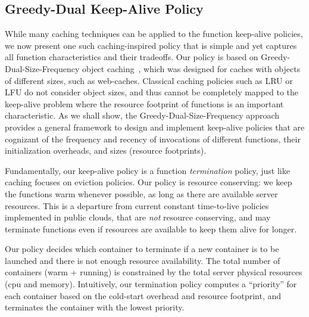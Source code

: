 


\vspace*{\subsecspace}
\subsection{Greedy-Dual Keep-Alive Policy}
\vspace*{\subsecspace}

While many caching techniques can be applied to the function keep-alive policies, we now present one such caching-inspired policy that is simple and yet captures all function characteristics and their tradeoffs.
Our policy is based on Greedy-Dual-Size-Frequency object caching~\cite{gdsf}, which was designed for caches with objects of  different sizes, such as web-caches. 
Classical caching policies such as LRU or LFU do not consider object sizes, and thus cannot be completely mapped to the keep-alive problem where the resource footprint of functions is an important characteristic. 
As we shall show, the Greedy-Dual-Size-Frequency approach provides a general framework to design and implement keep-alive policies that are cognizant of the  frequency and recency of invocations of different functions, their initialization overheads, and sizes (resource footprints). 



Fundamentally, our keep-alive policy is a function \emph{termination} policy, just like caching focuses on eviction policies. 
%
Our policy is resource conserving: we keep the functions warm whenever possible, as long as there are available server resources.
%
This is a departure from current constant time-to-live policies implemented in public clouds, that are \emph{not} resource conserving, and may terminate functions even if resources are available to keep them alive for longer. 

Our policy decides which container to terminate if a new container is to be launched and there is not enough resource availability.
%
The total number of containers (warm + running) is constrained by the total server physical resources (cpu and memory). 
%
Intuitively, our termination policy computes a ``priority'' for each container based on the cold-start overhead and resource footprint, and terminates the container with the lowest priority.
%


